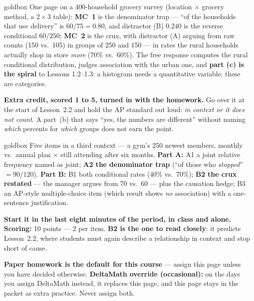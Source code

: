\documentclass[10pt]{article}
\begin{document}
\boxguard
\begin{skillbox}{goldbox}
One page on a 400-household grocery survey (location $\times$ grocery method, a $2\times3$
table): \textbf{MC~1} is the denominator trap --- ``of the households that use delivery'' is
$60/75 = 0.80$, and distractor (B) $0.240$ is the reverse conditional $60/250$; \textbf{MC~2} is
the crux, with distractor (A) arguing from raw counts (150 vs.\ 105) in groups of 250 and 150 ---
in rates the rural households actually shop in store \emph{more} (70\% vs.\ 60\%). The free
response computes the rural conditional distribution, judges association with the urban one,
and \textbf{part (c) is the spiral} to Lessons 1.2--1.3: a histogram needs a quantitative
variable; these are categories.

\textbf{Extra credit, scored 1 to 5, turned in with the homework.} Go over it at
the start of Lesson~2.2 and hold the AP standard out loud: \emph{in context or it does not
count}. A part~(b) that says ``yes, the numbers are different'' without naming \emph{which}
percents for \emph{which} groups does not earn the point.
\end{skillbox}

\boxguard
\begin{skillbox}{goldbox}
Five items in a third context --- a gym's 250 newest members, monthly vs.\ annual plan
$\times$ still attending after six months. \textbf{Part A:} A1 a joint relative frequency named
as joint; \textbf{A2 the denominator trap} (``of those who \emph{stopped}'' $= 90/120$).
\textbf{Part B:} B1 both conditional rates (40\% vs.\ 70\%); \textbf{B2 the crux restated} ---
the manager argues from 70 vs.\ 60 --- plus the causation hedge; B3 an AP-style multiple-choice
item (which result shows \emph{no} association) with a one-sentence justification.

\textbf{Start it in the last eight minutes of the period, in class and alone.}
\textbf{Scoring:} 10 points --- 2 per item. \textbf{B2 is the one to read closely}: it predicts
Lesson~2.2, where students must again describe a relationship in context and stop short of
cause.

\textbf{Paper homework is the default for this course} --- assign this page unless you have
decided otherwise. \textbf{DeltaMath override (occasional):} on the days you assign DeltaMath
instead, it replaces this page, and this page
stays in the packet as extra practice. Never assign both.
\end{skillbox}
\end{document}
